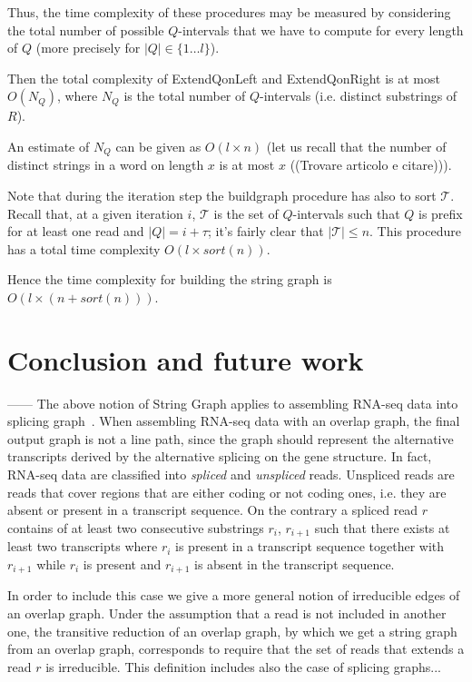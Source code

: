 \documentclass[runningheads,envcountsame,a4paper]{llncs}
\begin{document}
Thus, the time complexity of these procedures may be measured by
considering the total number of possible $Q$-intervals that we have to
compute for every length of $Q$ (more precisely for $|Q| \in \{1 \dots
l\}$).

Then the total  complexity of ExtendQonLeft and ExtendQonRight is at
most $O(N_Q)$, where $N_Q$ is the total number of
$Q$-intervals (i.e. distinct substrings of $R$).

An estimate of $N_Q$ can be given as $O(l \times n)$ (let us recall that
the number of distinct strings in a word on length $x$ is  at most $x$
((Trovare articolo e citare)\cite{})).

Note that during the iteration step the buildgraph procedure has also to
sort $\mathcal{T}$.
Recall that, at a given iteration $i$, $\mathcal{T}$ is the set of
$Q$-intervals such that $Q$ is prefix for at least one read and $|Q| = i
+ \tau$; it's fairly clear that $|\mathcal{T}| \leq n$.
This procedure has a total time complexity $O(l \times
sort(n))$.

Hence the time complexity for building the string graph is
$O(l \times (n + sort(n)))$.



\section{Conclusion and future work}
------
The above notion of String Graph applies to assembling RNA-seq data into
splicing graph~\cite{Beretta2013}.
When assembling RNA-seq data with an overlap graph, the final output
graph is not a line path, since the graph should represent the
alternative transcripts derived by the alternative splicing on the gene
structure.
In fact, RNA-seq data are classified into \emph{spliced} and
\emph{unspliced} reads.
Unspliced reads are reads that cover regions that are either coding or
not coding ones, i.e. they are absent or present in a transcript
sequence.
On the contrary a spliced read $r$ contains of at least two consecutive
substrings $r_i $, $r_{i+1}$ such that there exists at least two
transcripts where $r_i$ is present in a transcript sequence together
with $r_{i+1}$ while $r_i$ is present and $r_{i+1}$ is absent in the
transcript sequence.

In order to include this case we give a more general notion of
irreducible edges of an overlap graph.
Under the assumption that a read is not included in another one, the
transitive reduction of an overlap graph, by which we get a string graph
from an overlap graph, corresponds to require that the set of reads that
extends a read $r$ is irreducible.
This definition includes also the case of splicing graphs...



\end{document}
